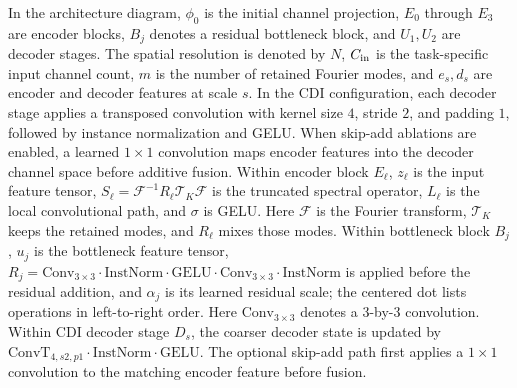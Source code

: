 \documentclass[11pt]{article}
\newcommand{\ConvTT}{\mathrm{Conv}_{3\times 3}}
\begin{document}
In the architecture diagram, $\phi_0$ is the initial channel projection, $E_0$
through $E_3$ are encoder blocks, $B_j$ denotes a residual bottleneck block, and
$U_1,U_2$ are decoder stages. The spatial resolution is denoted by $N$,
$C_{\rm in}$ is the task-specific input channel count, $m$ is the number of
retained Fourier modes, and $e_s,d_s$ are encoder and decoder features at scale
$s$. In the CDI configuration, each decoder stage applies a transposed
convolution with kernel size $4$, stride $2$, and padding $1$, followed by
instance normalization and GELU. When skip-add ablations are enabled, a learned
$1\times1$ convolution maps encoder features into the decoder channel space
before additive fusion.
Within encoder block $E_\ell$, $z_\ell$ is the input feature tensor,
$S_\ell=\mathcal F^{-1}R_\ell\mathcal T_K\mathcal F$ is the truncated spectral
operator, $L_\ell$ is the local convolutional path, and $\sigma$ is GELU. Here
$\mathcal F$ is the Fourier transform, $\mathcal T_K$ keeps the retained modes,
and $R_\ell$ mixes those modes. Within bottleneck block
$B_j$, $u_j$ is the bottleneck feature tensor,
$R_j=\ConvTT\cdot\mathrm{InstNorm}\cdot\mathrm{GELU}
\cdot\ConvTT\cdot\mathrm{InstNorm}$ is applied before the
residual addition, and $\alpha_j$ is its learned residual scale; the centered
dot lists operations in left-to-right order. Here $\ConvTT$ denotes a
3-by-3 convolution. Within CDI decoder stage $D_s$, the coarser decoder state is
updated by $\mathrm{ConvT}_{4,s2,p1}\cdot\mathrm{InstNorm}\cdot\mathrm{GELU}$.
The optional skip-add path first applies a $1\times1$ convolution to the matching
encoder feature before fusion.
\end{document}
